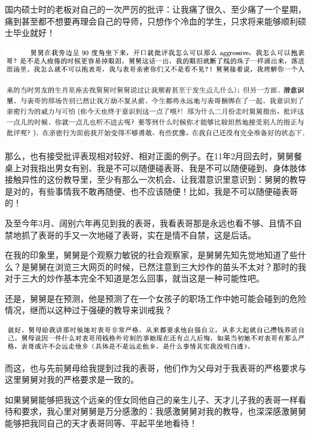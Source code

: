 \documentclass[9pt, b5paper]{article}
\begin{document}
国内硕士时的老板对自己的一次严厉的批评：让我痛了很久、至少痛了一个星期，痛到甚至都不想要再理会自己的导师，只想作个冷血的学生，只求将来能够顺利硕士毕业就好！

\begin{center}
\includegraphics[width=.9\linewidth]{./pic/backups_plans_20210412_110604.png}
\end{center}

\begin{center}
\includegraphics[width=.9\linewidth]{./pic/backups_plans_20210412_110513.png}
\end{center}

那么，也有接受批评表现相对较好、相对正面的例子。在11年2月回去时，舅舅餐桌上对我指出男女有别、我是不可以随便碰表哥、我是不可以随便碰到、身体肢体接触异性的这份教导里，至少有那么一次机会、让我潜意识里意识到：舅舅的教导是对的，有些事情我不敢再随便、也不应该随便！比如，我是不可以随便碰表哥的！

及至今年3月、阔别六年再见到我的表哥，我看表哥那是永远也看不够、且情不自禁地抓了表哥的手又一次地碰了表哥，实在是情不自禁，这是后话。 

在我的印象里，舅舅是个观察力敏锐的社会观察家，是舅舅先知先觉地知道了些什么？是舅舅在浏览三大网页的时候，已然注意到三大炒作的苗头不太对？那时的我对于三大的炒作基本完全不知道是怎么回事，就当这是一种可能性吧。

还是，舅舅是在预测，他是预测了在一个女孩子的职场工作中她可能会碰到的危险情况，继而以这种过于强硬的教导来训戒我？

\begin{center}
\includegraphics[width=.9\linewidth]{./pic/backups_plans_20210412_112222.png}
\end{center}

而这，也与先前舅母给我提到过我的表哥，他们作为父母对于我表哥的严格要求与这里舅舅对我的严格要求是一致的。

如果舅舅能够把我这个远亲的侄女同他自己的亲生儿子、天才儿子我的表哥一样看待和要求，我心里对舅舅是万分感激的：我感激舅舅对我的教导，也深深感激舅舅能够把我同自己的天才表哥同等、平起平坐地看待！
\end{document}
